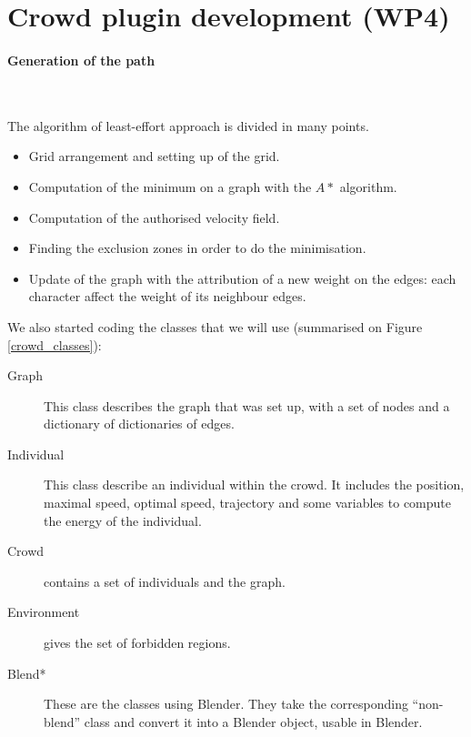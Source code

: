\section{Crowd plugin development (WP4)}

\paragraph{Generation of the path}~

\noindent The algorithm of least-effort approach is divided in many points.
\begin{itemize}
  \item Grid arrangement and setting up of the grid.
  \item Computation of the minimum on a graph with the $A*$ algorithm.
  \item Computation of the authorised velocity field.
  \item Finding the exclusion zones in order to do the minimisation.
  \item Update of the graph with the attribution of a new weight on the edges: each character affect the weight of its neighbour edges.
\end{itemize}



\noindent We also started coding the classes that we will use (summarised on Figure \ref{crowd_classes}):
\begin{description}
  \item[Graph] This class describes the graph that was set up, with a set of nodes and a dictionary of dictionaries of edges.
  \item[Individual] This class describe an individual within the crowd. It includes the position, maximal speed, optimal speed, trajectory and some variables to compute the energy of the individual.
  \item[Crowd] contains a set of individuals and the graph.
  \item[Environment] gives the set of forbidden regions.
  \item[Blend*] These are the classes using Blender. They take the corresponding ``non-blend'' class and convert it into a Blender object, usable in Blender. 
\end{description}


